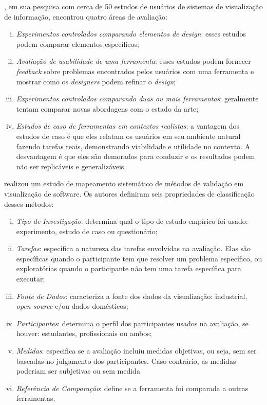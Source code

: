 \citeauthor{komlodi2004information}, em sua pesquisa com cerca de 50 estudos de usuários de sistemas de visualização de informação, encontrou quatro áreas de avaliação:
\begin{enumerate}[(i)]
	\item \textit{Experimentos controlados comparando elementos de design}: esses estudos podem comparar elementos específicos;
	\item \textit{Avaliação de usabilidade de uma ferramenta}: esses estudos podem fornecer \textit{feedback} sobre problemas encontrados pelos usuários com uma ferramenta e mostrar como os \textit{designers} podem refinar o \textit{design};
	\item \textit{Experimentos controlados comparando duas ou mais ferramentas}: geralmente tentam comparar novas abordagens com o estado da arte;
	\item \textit{Estudos de caso de ferramentas em contextos realistas}: a vantagem dos estudos de caso é que eles relatam os usuários em seu ambiente natural fazendo tarefas reais, demonstrando viabilidade e utilidade no contexto. A desvantagem é que eles são demorados para conduzir e os resultados podem não ser replicáveis e generalizáveis.
\end{enumerate}

\citeauthor{Seriai2014} realizou um estudo de mapeamento sistemático de métodos de validação em visualização de software. Os autores definiram seis propriedades de classificação desses métodos:
\begin{enumerate}[(i)]
	\item \textit{Tipo de Investigação}: determina qual o tipo de estudo empírico foi usado: experimento, estudo de caso ou questionário;
	\item \textit{Tarefas}: especifica a natureza das tarefas envolvidas na avaliação. Elas são específicas quando o participante tem que resolver um problema específico, ou exploratórias quando o participante não tem uma tarefa específica para executar;
	\item \textit{Fonte de Dados}: caracteriza a fonte dos dados da visualização: industrial, \textit{open source} e/ou dados domésticos;
	\item \textit{Participantes}: determina o perfil dos participantes usados na avaliação, se houver: estudantes, profissionais ou ambos;
	\item \textit{Medidas}: especifica se a avaliação incluiu medidas objetivas, ou seja, sem ser baseadas no julgamento dos participantes. Caso contrário, as medidas poderiam ser subjetivas ou sem medida
	\item \textit{Referência de Comparação}: define se a ferramenta foi comparada a outras ferramentas.
\end{enumerate}

